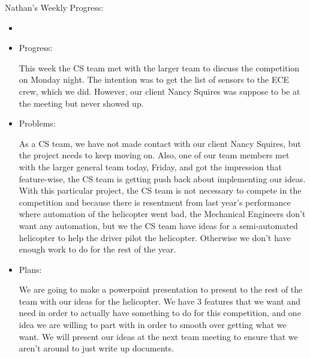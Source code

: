 \documentclass[onecolumn, oneside, letterpaper, draftclsnofoot, 10pt, compsoc]{IEEEtran}
\begin{document}
Nathan's Weekly Progress:
\begin{itemize}
    \item
    \item Progress:

This week the CS team met with the larger team to discuss the competition on Monday night. The intention was to get the list of sensors to the ECE crew, which we did. However, our client Nancy Squires was suppose to be at the meeting but never showed up.
    \item Problems:

As a CS team, we have not made contact with our client Nancy Squires, but the project needs to keep moving on. Also, one of our team members met with the larger general team today, Friday, and got the impression that feature-wise, the CS team is getting push back about implementing our ideas. With this particular project, the CS team is not necessary to compete in the competition and because there is resentment from last year's performance where automation of the helicopter went bad, the Mechanical Engineers don't want any automation, but we the CS team have ideas for a semi-automated helicopter to help the driver pilot the helicopter. Otherwise we don't have enough work to do for the rest of the year.
    \item Plans:

We are going to make a powerpoint presentation to present to the rest of the team with our ideas for the helicopter. We have 3 features that we want and need in order to actually have something to do for this competition, and one idea we are willing to part with in order to smooth over getting what we want. We will present our ideas at the next team meeting to ensure that we aren't around to just write up documents.
    \end{itemize}
\end{document}
